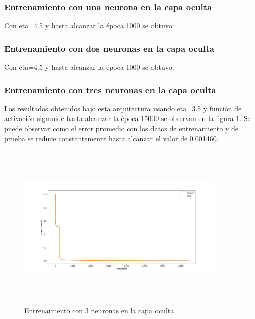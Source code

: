 \documentclass[11pt]{article}
\begin{document}
\subsubsection{Entrenamiento con una neurona en la capa oculta}
Con eta=4.5 y hasta alcanzar la \'epoca 1000 se obtuvo:
\subsubsection{Entrenamiento con dos neuronas en la capa oculta}
Con eta=4.5 y hasta alcanzar la \'epoca 1000 se obtuvo:
\subsubsection{Entrenamiento con tres neuronas en la capa oculta}
Los resultados obtenidos bajo esta arquitectura usando eta=3.5 y funci\'on de activaci\'on sigmoide
hasta alcanzar la \'epoca 15000 se observan en la figura \ref{fig:result_3hn}. Se puede observar como el error promedio con los datos de entrenamiento y de prueba
se reduce constantemente hasta alcanzar el valor de 0.001460.
\begin{figure}[ht]
    \includegraphics[width=10cm, height=8cm]{result_3hn}
    \centering
    \caption{Entrenamiento con 3 neuronas en la capa oculta}
    \label{fig:result_3hn}
\end{figure}
\end{document}
